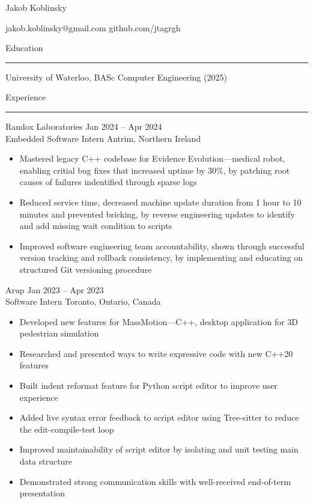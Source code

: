 \documentclass{article}
\newenvironment{mysection}[1]
{ {\large #1}

	\vspace{-1em}
	\rule{\linewidth}{0.4pt} 

} { \vspace{1em} }
\begin{document}

\begin{center}
{\huge Jakob Koblinsky}

jakob.koblinsky@gmail.com \quad github.com/jtagrgh
\end{center}

\vspace{0.25in}

\begin{mysection}{Education}
University of Waterloo, BASc Computer Engineering (2025)
\end{mysection}

\begin{mysection}{Experience}
Randox Laboratories \hfill Jan 2024 – Apr 2024 \\
Embedded Software Intern \hfill Antrim, Northern Ireland
\begin{itemize}[noitemsep,left=0pt,label={--}]
	\item 
	Mastered legacy C++ codebase for Evidence Evolution—medical robot,
	enabling critial bug fixes that increased uptime by 30\%, 
	by patching root causes of failures indentified through sparse logs
	\item
	Reduced service time, 
	decreased machine update duration from 1 hour to 10 minutes and prevented bricking, 
	by reverse engineering updates to identify and add missing wait condition to scripts
	\item
	Improved software engineering team accountability, 
	shown through successful version tracking and rollback consistency,
	by implementing and educating on structured Git versioning procedure
\end{itemize}
\vspace{1em}

Arup \hfill Jan 2023 – Apr 2023 \\
Software Intern \hfill Toronto, Ontario, Canada
\begin{itemize}[noitemsep,left=0pt,label={--}]
	\item Developed new features for MassMotion—C++, desktop application for 3D pedestrian simulation
	\item Researched and presented ways to write expressive code with new C++20 features
	\item Built indent reformat feature for Python script editor to improve user experience
	\item Added live syntax error feedback to script editor using Tree-sitter to reduce the edit-compile-test loop
	\item Improved maintainability of script editor by isolating and unit testing main data structure
	\item Demonstrated strong communication skills with well-received end-of-term presentation
\end{itemize}
\vspace{1em}


\end{mysection}
\end{document}
